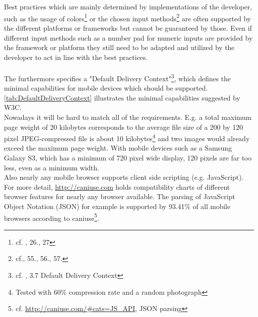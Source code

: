 \\
\\
Best practices which are mainly determined by implementations of the developer, such as the usage of colors\footnote{cf. \cite{WorldWideWebConsortium.2008}, 26., 27} or the chosen input methods\footnote{cf.\cite{WorldWideWebConsortium.2008}, 55., 56., 57.} are often supported by the different platforms or frameworks but cannot be guaranteed by those. Even if different input methods such as a number pad for numeric inputs are provided by the framework or platform they still need to be adapted and utilized by the developer to act in line with the best practices.
\\
\\
The \cite{WorldWideWebConsortium.2008} furthermore specifies a "Default Delivery Context"\footnote{cf. \cite{WorldWideWebConsortium.2008}, 3.7 Default Delivery Context}, which defines the minimal capabilities for mobile devices which should be supported. \ref{tab:DefaultDeliveryContext} illustrates the minimal capabilities suggested by W3C.
\\
Nowadays it will be hard to match all of the requirements. E.g. a total maximum page weight of 20 kilobytes corresponds to the average file size of a 200 by 120 pixel JPEG-compressed file is about 10 kilobytes\footnote{Tested with 60\% compression rate and a random photograph} and two images would already exceed the maximum page weight. With mobile devices such as a Samsung Galaxy S3, which has a minimum of 720 pixel wide display, 120 pixels are far too less, even as a minimum width.
\\
Also nearly any mobile browser supports client side scripting (e.g. JavaScript). For more detail, \url{http://caniuse.com} holds compatibility charts of different browser features for nearly any browser available. The parsing of JavaScript Object Notation (JSON) for example is supported by 93.41\% of all mobile browsers according to caniuse\footnote{cf. \url{http://caniuse.com/\#cats=JS_API}, JSON parsing}.
